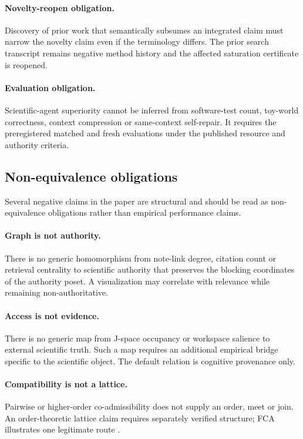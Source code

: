 \paragraph{Novelty-reopen obligation.}
Discovery of prior work that semantically subsumes an integrated \RAKL{} claim must narrow the novelty claim even if the terminology differs. The prior search transcript remains negative method history and the affected saturation certificate is reopened.

\paragraph{Evaluation obligation.}
Scientific-agent superiority cannot be inferred from software-test count, toy-world correctness, context compression or same-context self-repair. It requires the preregistered matched and fresh evaluations under the published resource and authority criteria.

\subsection{Non-equivalence obligations}

Several negative claims in the paper are structural and should be read as non-equivalence obligations rather than empirical performance claims.

\paragraph{Graph is not authority.}
There is no generic homomorphism from note-link degree, citation count or retrieval centrality to scientific authority that preserves the blocking coordinates of the authority poset. A visualization may correlate with relevance while remaining non-authoritative.

\paragraph{Access is not evidence.}
There is no generic map from J-space occupancy or workspace salience to external scientific truth. Such a map requires an additional empirical bridge specific to the scientific object. The default relation is cognitive provenance only.

\paragraph{Compatibility is not a lattice.}
Pairwise or higher-order co-admissibility does not supply an order, meet or join. An order-theoretic lattice claim requires separately verified structure; FCA illustrates one legitimate route \cite{ganterwille2024}.

